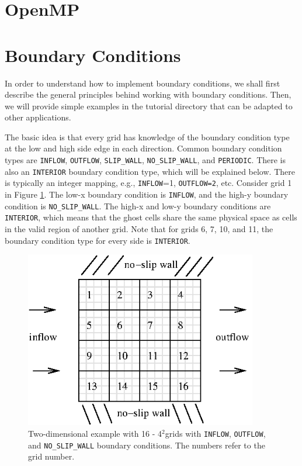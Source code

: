 \section{OpenMP}\label{Sec:OpenMP}

\section{Boundary Conditions}\label{Sec:Boundary Conditions}
In order to understand how to implement boundary conditions, we shall 
first describe the general principles behind working with boundary conditions.
Then, we will provide simple examples in the tutorial directory that can be 
adapted to other applications.

The basic idea is that every grid has knowledge of the
boundary condition type at the low and high side edge in each direction.
Common boundary condition types are {\tt INFLOW}, {\tt OUTFLOW}, {\tt SLIP\_WALL},
{\tt NO\_SLIP\_WALL}, and {\tt PERIODIC}.
There is also an {\tt INTERIOR} boundary condition type, which 
will be explained below.  There is typically an integer mapping, e.g., {\tt INFLOW}=1,
{\tt OUTFLOW=2}, etc.  Consider grid 1 in Figure \ref{fig:bc_example1}.  The
low-x boundary condition is {\tt INFLOW}, and the high-y boundary condition is
{\tt NO\_SLIP\_WALL}.  The high-x and low-y boundary conditions are {\tt INTERIOR}, which
means that the ghost cells share the same physical space as cells in the valid region of 
another grid.  Note that for grids 6, 7, 10, and 11, the boundary condition type for
every side is {\tt INTERIOR}.
\begin{figure}[tb]
\centering
\includegraphics[width=4in]{./AdvancedTopics/bc_example1}
\caption{\label{fig:bc_example1}Two-dimensional example with 16 - 4$^2$grids with
{\tt INFLOW}, {\tt OUTFLOW}, and {\tt NO\_SLIP\_WALL} boundary conditions.
The numbers refer to the grid number.}
\end{figure}

